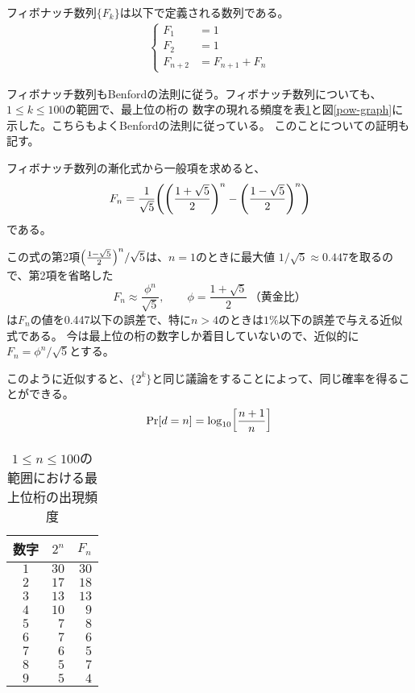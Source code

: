 \documentclass[jafontsize=9pt,twocolumn]{jlreq}
\begin{document}
フィボナッチ数列$\{F_k\}$は以下で定義される数列である。
\begin{align*}
\begin{cases}
	F_1&=1\\
	F_2&=1\\
	F_{n+2}&=F_{n+1}+F_n
\end{cases}
\end{align*}

フィボナッチ数列もBenfordの法則に従う。フィボナッチ数列についても、$1\leq k\leq 100$の範囲で、最上位の桁の
数字の現れる頻度を表\ref{pow-tbl}と図\ref{pow-graph}に示した。こちらもよくBenfordの法則に従っている。
このことについての証明も記す。

フィボナッチ数列の漸化式から一般項を求めると、
\[F_n=\frac{1}{\sqrt{5}}\mleft(\mleft(\frac{1+\sqrt{5}}{2}\mright)^n-\mleft(\frac{1-\sqrt{5}}{2}\mright)^n\mright)\]
である。

この式の第2項$\mleft(\frac{1-\sqrt{5}}{2}\mright)^n/\sqrt{5}$は、$n=1$のときに最大値
$1/\sqrt{5}\approx 0.447$を取るので、第2項を省略した
\[F_n\approx \frac{\phi^n}{\sqrt{5}}, \qquad \phi=\frac{1+\sqrt{5}}{2}\,\text{（黄金比）}\]
は$F_n$の値を0.447以下の誤差で、特に$n>4$のときは$1\%$以下の誤差で与える近似式である。
今は最上位の桁の数字しか着目していないので、近似的に$F_n=\phi^n/\sqrt{5}$とする。

このように近似すると、$\{2^k\}$と同じ議論をすることによって、同じ確率を得ることができる。
\[\Pr[d=n]=\log_{10}\mleft[\frac{n+1}{n}\mright]\]


\begin{table}[b]
\caption{$1\leq n\leq100$の範囲における最上位桁の出現頻度}
\label{pow-tbl}
\centering
\begin{tabular}{c|rr}
\hline
数字&$2^n$&$F_n$\\
\hline\hline
$1$&$30$&$30$\\
$2$&$17$&$18$\\
$3$&$13$&$13$\\
$4$&$10$&$9$\\
$5$&$7$&$8$\\
$6$&$7$&$6$\\
$7$&$6$&$5$\\
$8$&$5$&$7$\\
$9$&$5$&$4$\\
\hline
\end{tabular}
\end{table}
\end{document}
